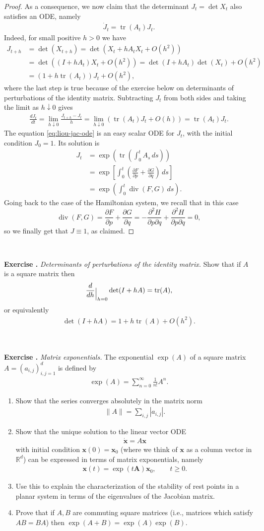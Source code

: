 \documentclass[12pt]{amsart}
\newcommand{\eq}[1]{\begin{equation}\begin{split}#1\end{split}\end{equation}}
\newcommand{\eqst}[1]{\begin{align*}#1\end{align*}}
\newcommand{\divr}{\operatorname{div}}
\newcommand{\der}[2]{\frac{d#1}{d#2}}
\newcommand{\pder}[2]{\frac{\partial#1}{\partial#2}}
\newcounter{exercise}
\newcommand{\beginexercise}[1]{\ \\ \addtocounter{exercise}{1} \textbf{Exercise \arabic{exercise}.} \textit{#1.}}
\begin{document}
\begin{proof}
As a consequence, we now claim that the determinant $J_t = \det X_t$ also satisfies an ODE, namely
\eq{ \label{eq:liou-jac-ode}
\dot{J}_t = \operatorname{tr}(A_t) J_t.
}
Indeed, for small positive $h>0$ we have
\eqst{
J_{t+h} &= \det(X_{t+h}) = \det( X_t+h A_t X_t + O(h^2) ) \\ 
&= \det((I+h A_t)X_t+O(h^2))
= \det(I+h A_t) \det(X_t) + O(h^2)
\\ &= (1 + h \operatorname{tr}(A_t)) J_t + O(h^2),
}
where the last step is true because of the exercise below on determinants of perturbations of the identity matrix.
Subtracting $J_t$ from both sides and taking the limit as $h\downarrow 0$ gives
\eqst{
\der{J_t}{t} = \lim_{h\downarrow 0} \frac{J_{t+h}-J_t}{h} = 
\lim_{h\downarrow 0} \left(\operatorname{tr}(A_t)J_t + O(h)\right) = \operatorname{tr}(A_t)J_t.
}
The equation \eqref{eq:liou-jac-ode} is an easy scalar ODE for $J_t$, with the initial condition $J_0=1$. Its solution is
\eq{ \label{eq:liouville-jacobian}
J_t &= \exp\left( \operatorname{tr}\left(\int_0^t A_s\,ds\right)\right)
\\ &= \exp\left[ \int_0^t \left(\pder{F}{p}+\pder{G}{q}\right)\,ds \right]
\\ &= \exp\left( \int_0^t \divr(F,G) \,ds \right).
}
Going back to the case of the Hamiltonian system, we recall that in this case
$$ \divr (F,G) = \pder{F}{p}+\pder{G}{q} = -\frac{\partial^2 H}{\partial p \partial q} + 
\frac{\partial^2 H}{\partial p \partial q} = 0, $$
so we finally get that $J \equiv 1$, as claimed.
\end{proof}

\beginexercise{Determinants of perturbations of the identity matrix} Show that if $A$ is a square matrix then
\eqst{
\der{}{h}{\raisebox{-5pt}{\Big|}_{h=0}} \det(I+h A) = \operatorname{tr}(A),
}
or equivalently
\eqst{
\det(I+h A) = 1 + h \operatorname{tr}(A) + O(h^2).
}

\beginexercise{Matrix exponentials} The exponential $\exp(A)$ of a square matrix $A=(a_{i,j})_{i,j=1}^d$ is defined by
\eqst{ \exp(A) = \sum_{n=0}^\infty \frac{1}{n!} A^n. }
\begin{enumerate}
\item Show that the series converges absolutely in the matrix norm 
\eqst{ \lVert A \rVert = \sum_{i,j} |a_{i,j}|. }
\item Show that the unique solution to the linear vector ODE
\eqst{
\dot{\mathbf{x}} = A \mathbf{x}
}
with initial condition $\mathbf{x}(0) = \mathbf{x}_0$ (where we think of $\mathbf{x}$ as a column vector in $\mathbb{R}^d$) can be expressed in terms of matrix exponentials, namely
\eqst{ \mathbf{x}(t) = \exp\left(t \mathbf{A}\right) \mathbf{x}_0, \qquad t\ge 0. }
\item Use this to explain the characterization of the stability of rest points in a planar system in terms of the eigenvalues of the Jacobian matrix.

\item Prove that if $A, B$ are commuting square matrices (i.e., matrices which satisfy $AB=BA$) then $\exp(A+B)=\exp(A)\exp(B)$.
\end{enumerate}
\end{document}
